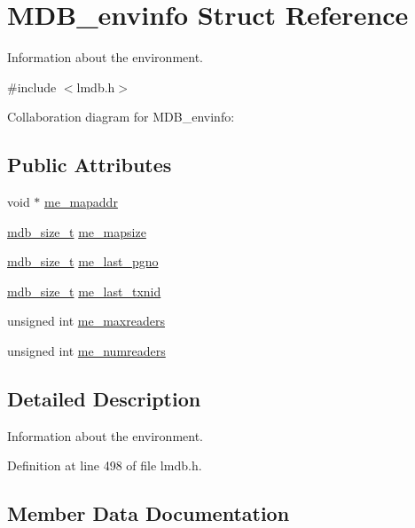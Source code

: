 \hypertarget{struct_m_d_b__envinfo}{}\section{M\+D\+B\+\_\+envinfo Struct Reference}
\label{struct_m_d_b__envinfo}


Information about the environment.  




{\ttfamily \#include $<$lmdb.\+h$>$}



Collaboration diagram for M\+D\+B\+\_\+envinfo\+:
\subsection*{Public Attributes}
\begin{DoxyCompactItemize}
\item 
void $\ast$ \mbox{\hyperlink{struct_m_d_b__envinfo_aebb8447a3392f888baf6f134fcadaac2}{me\+\_\+mapaddr}}
\item 
\mbox{\hyperlink{lmdb_8h_a78821971e612e3898ef4b3ae45ed86f1}{mdb\+\_\+size\+\_\+t}} \mbox{\hyperlink{struct_m_d_b__envinfo_a0ded63ecbac730090374854e15f30d2e}{me\+\_\+mapsize}}
\item 
\mbox{\hyperlink{lmdb_8h_a78821971e612e3898ef4b3ae45ed86f1}{mdb\+\_\+size\+\_\+t}} \mbox{\hyperlink{struct_m_d_b__envinfo_a10d4af021d2625bfee35f25ca60de6ce}{me\+\_\+last\+\_\+pgno}}
\item 
\mbox{\hyperlink{lmdb_8h_a78821971e612e3898ef4b3ae45ed86f1}{mdb\+\_\+size\+\_\+t}} \mbox{\hyperlink{struct_m_d_b__envinfo_aad6893e0c0d1219fe29262a7ab1af5eb}{me\+\_\+last\+\_\+txnid}}
\item 
unsigned int \mbox{\hyperlink{struct_m_d_b__envinfo_a0a55ab3e5584ea6bb51caec3516e134b}{me\+\_\+maxreaders}}
\item 
unsigned int \mbox{\hyperlink{struct_m_d_b__envinfo_af20468962fceb98d99e15c314955e290}{me\+\_\+numreaders}}
\end{DoxyCompactItemize}


\subsection{Detailed Description}
Information about the environment. 

Definition at line 498 of file lmdb.\+h.



\subsection{Member Data Documentation}
\mbox{\label{struct_m_d_b__envinfo_a10d4af021d2625bfee35f25ca60de6ce}} 
